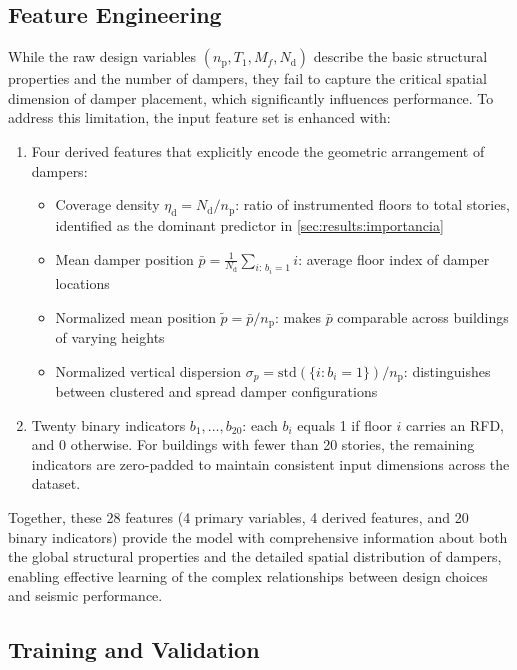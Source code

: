 \documentclass[preprint,12pt,authoryear]{elsarticle}
\newcommand{\nd}{N_{\mathrm{d}}}
\newcommand{\np}{n_{\mathrm{p}}}
\newcommand{\etad}{\eta_{\mathrm{d}}}
\newcommand{\Mf}{M_{\!f}}
\begin{document}
\subsection{Feature Engineering}
\label{sec:method:features}

While the raw design variables $(\np, T_1, \Mf, \nd)$ describe the basic structural properties and the number of dampers, they fail to capture the critical spatial dimension of damper placement, which significantly influences performance. To address this limitation, the input feature set is enhanced with:

\begin{enumerate}[label=\textit{\roman*})]
	\item Four derived features that explicitly encode the geometric arrangement of dampers:
	\begin{itemize}
		\item Coverage density $\etad = \nd/\np$: ratio of instrumented floors to total stories, identified as the dominant predictor in \cref{sec:results:importancia}
		\item Mean damper position $\bar{p} = \tfrac{1}{\nd}\sum_{i:\,b_i=1} i$: average floor index of damper locations
		\item Normalized mean position $\tilde{p} = \bar{p}/\np$: makes $\bar{p}$ comparable across buildings of varying heights
		\item Normalized vertical dispersion $\sigma_p = \mathrm{std}\!\left(\{i:b_i=1\}\right)/\np$: distinguishes between clustered and spread damper configurations
	\end{itemize}
	
	\item Twenty binary indicators $b_1,\ldots,b_{20}$: each $b_i$ equals 1 if floor $i$ carries an RFD, and 0 otherwise. For buildings with fewer than 20 stories, the remaining indicators are zero-padded to maintain consistent input dimensions across the dataset.
\end{enumerate}

Together, these 28 features (4 primary variables, 4 derived features, and 20 binary indicators) provide the model with comprehensive information about both the global structural properties and the detailed spatial distribution of dampers, enabling effective learning of the complex relationships between design choices and seismic performance.

\subsection{Training and Validation}
\label{sec:method:training}
\end{document}
